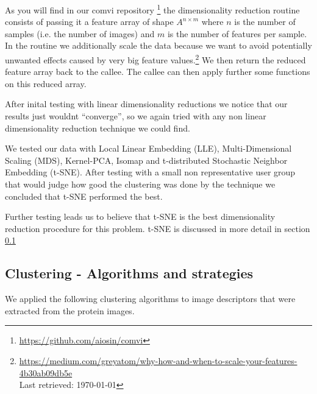 \documentclass[journal]{vgtc}       %
\begin{document}
As you will find in our comvi repository \footnote{\url{https://github.com/aiosin/comvi}} the dimensionality reduction routine consists of passing it a feature array of shape \(A^{n\times m}\) where \(n\) is the number of samples (i.e. the number of images) and \(m\) is the number of features per sample.
In the routine we additionally scale the data because we want to avoid potentially unwanted effects caused by very big feature values.\footnote{\url{https://medium.com/greyatom/why-how-and-when-to-scale-your-features-4b30ab09db5e} \\ Last retrieved: \today}
We then return the reduced feature array back to the callee. The callee can then apply further some functions on this reduced array.

After inital testing with linear dimensionality reductions we notice that our results just wouldnt ``converge'', so we again tried with any non linear dimensionality reduction technique we could find.

We tested our data with Local Linear Embedding (LLE), Multi-Dimensional Scaling (MDS), Kernel-PCA, Isomap and t-distributed Stochastic Neighbor Embedding (t-SNE).
After testing with a small non representative user group that would judge how good the clustering was done by the technique we concluded that t-SNE performed the best.

Further testing leads us to believe that t-SNE is the best dimensionality reduction procedure for this problem. t-SNE is discussed in more detail in section \ref{sec:clusteringa}


\subsection{Clustering - Algorithms and strategies }\label{sec:clusteringa}
We applied the following clustering algorithms to image descriptors that were extracted from the protein images.
\end{document}
